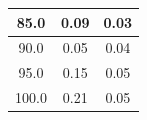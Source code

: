 \begin{tabular}{|c|c|c|}
85.0                                                                               & 0.09  & 0.03           \\ \hline
90.0                                                                               & 0.05  & 0.04           \\ \hline
95.0                                                                               & 0.15  & 0.05           \\ \hline
100.0                                                                              & 0.21  & 0.05           \\ \hline
\end{tabular}